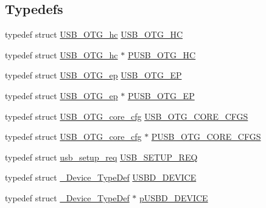 \subsection*{Typedefs}
\begin{DoxyCompactItemize}
\item 
typedef struct \hyperlink{struct_u_s_b___o_t_g__hc}{U\-S\-B\-\_\-\-O\-T\-G\-\_\-hc} \hyperlink{group___u_s_b___c_o_r_e___exported___types_ga9025487237e4d60a4406daecca98cee0}{U\-S\-B\-\_\-\-O\-T\-G\-\_\-\-H\-C}
\item 
typedef struct \hyperlink{struct_u_s_b___o_t_g__hc}{U\-S\-B\-\_\-\-O\-T\-G\-\_\-hc} $\ast$ \hyperlink{group___u_s_b___c_o_r_e___exported___types_ga918abf6d2f47783cf88b380bb6f72aae}{P\-U\-S\-B\-\_\-\-O\-T\-G\-\_\-\-H\-C}
\item 
typedef struct \hyperlink{struct_u_s_b___o_t_g__ep}{U\-S\-B\-\_\-\-O\-T\-G\-\_\-ep} \hyperlink{group___u_s_b___c_o_r_e___exported___types_gad1c65925021e8dac88858e10bb2a7eea}{U\-S\-B\-\_\-\-O\-T\-G\-\_\-\-E\-P}
\item 
typedef struct \hyperlink{struct_u_s_b___o_t_g__ep}{U\-S\-B\-\_\-\-O\-T\-G\-\_\-ep} $\ast$ \hyperlink{group___u_s_b___c_o_r_e___exported___types_ga380f8f3808d66e043e2091857c2a1348}{P\-U\-S\-B\-\_\-\-O\-T\-G\-\_\-\-E\-P}
\item 
typedef struct \hyperlink{struct_u_s_b___o_t_g__core__cfg}{U\-S\-B\-\_\-\-O\-T\-G\-\_\-core\-\_\-cfg} \hyperlink{group___u_s_b___c_o_r_e___exported___types_ga76fe5e2e503de333886f75f641935563}{U\-S\-B\-\_\-\-O\-T\-G\-\_\-\-C\-O\-R\-E\-\_\-\-C\-F\-G\-S}
\item 
typedef struct \hyperlink{struct_u_s_b___o_t_g__core__cfg}{U\-S\-B\-\_\-\-O\-T\-G\-\_\-core\-\_\-cfg} $\ast$ \hyperlink{group___u_s_b___c_o_r_e___exported___types_ga665bbb54f16a13384ebe34469d30cc45}{P\-U\-S\-B\-\_\-\-O\-T\-G\-\_\-\-C\-O\-R\-E\-\_\-\-C\-F\-G\-S}
\item 
typedef struct \hyperlink{structusb__setup__req}{usb\-\_\-setup\-\_\-req} \hyperlink{group___u_s_b___c_o_r_e___exported___types_gacd8d898c844c3657315c7d7a4ea3a99c}{U\-S\-B\-\_\-\-S\-E\-T\-U\-P\-\_\-\-R\-E\-Q}
\item 
typedef struct \hyperlink{struct___device___type_def}{\-\_\-\-Device\-\_\-\-Type\-Def} \hyperlink{group___u_s_b___c_o_r_e___exported___types_ga383d3d5bf4017c2d95af4e092892d946}{U\-S\-B\-D\-\_\-\-D\-E\-V\-I\-C\-E}
\item 
typedef struct \hyperlink{struct___device___type_def}{\-\_\-\-Device\-\_\-\-Type\-Def} $\ast$ \hyperlink{group___u_s_b___c_o_r_e___exported___types_ga8eb51ab67492c9ffc0a83444e2ec9872}{p\-U\-S\-B\-D\-\_\-\-D\-E\-V\-I\-C\-E}

\end{DoxyCompactItemize}
